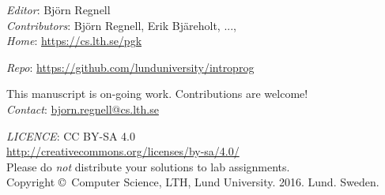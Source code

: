
\clearpage\null\thispagestyle{empty}
\vfill

{
\setlength{\parindent}{0pt}
\emph{Editor}: Björn Regnell \\ 

\emph{Contributors}: 
Björn Regnell, Erik Bjäreholt, ..., 
\\

\emph{Home}: \url{https://cs.lth.se/pgk} \\ \newline

\emph{Repo}: \url{https://github.com/lunduniversity/introprog} \\ \newline


This manuscript is on-going work. Contributions are welcome! \\ 
\emph{Contact}: \url{bjorn.regnell@cs.lth.se}
\\ \newline

\emph{LICENCE}: CC BY-SA 4.0 \\
\url{http://creativecommons.org/licenses/by-sa/4.0/} \\
Please do \emph{not} distribute your solutions to lab assignments. 
\\ \newline
Copyright \copyright~Computer Science, LTH, Lund University. 2016. Lund. Sweden.\\
}